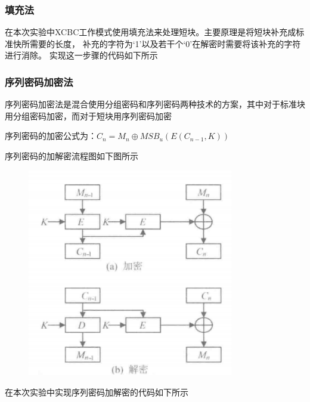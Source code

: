 \documentclass[a4paper,11pt,UTF8]{ctexart}
\newcommand{\bottomcaption}{%
\setlength{\abovecaptionskip}{6pt}%
\setlength{\belowcaptionskip}{6pt}%
\caption}
\newcommand{\xiaowuhao}{\fontsize{9pt}{\baselineskip}\selectfont}   %
\begin{document}
        \subsubsection{填充法}
            在本次实验中XCBC工作模式使用填充法来处理短块。主要原理是将短块补充成标准快所需要的长度，
            补充的字符为‘1’以及若干个‘0’在解密时需要将该补充的字符进行消除。
            实现这一步骤的代码如下所示
            

        \subsubsection{序列密码加密法}
            序列密码加密法是混合使用分组密码和序列密码两种技术的方案，其中对于标准块用分组密码加密，而对于短块用序列密码加密\par
            序列密码的加密公式为：$C_{n}=M_{n}\oplus MSB_{u}(E(C_{n-1},K))$\par
            序列密码的加解密流程图如下图所示
            \begin{figure}[H]
                \centering
                \includegraphics[width=9cm]{序列密码加解密.png}
                \bottomcaption{\xiaowuhao{序列密码加密法}}
            \end{figure}
            在本次实验中实现序列密码加解密的代码如下所示
            
\end{document}

